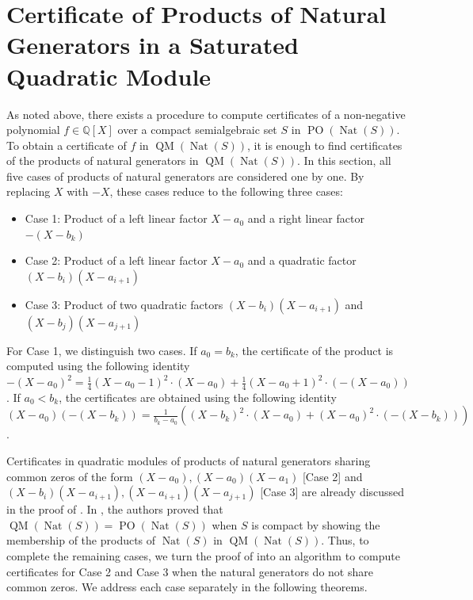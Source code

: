 \documentclass[preprint,12pt,authoryear]{elsarticle}
\newcommand{\qX}{\mathbb{Q}[X]}
\DeclareMathOperator{\quadmod}{QM}
\DeclareMathOperator{\preord}{PO}
\DeclareMathOperator{\Nat}{Nat}
\begin{document}
 \section{Certificate of Products of Natural Generators in a Saturated Quadratic Module} \label{cert_prods}

As noted above, there exists a procedure to compute certificates of a
non-negative polynomial $f \in \qX$ over a compact semialgebraic set $S$ in
$\preord(\Nat(S))$. To obtain a certificate of $f$ in $\quadmod(\Nat(S))$, it is
enough to find certificates of the products of natural generators in
$\quadmod(\Nat(S))$. In this section, all five cases of products of natural
generators are considered one by one. By replacing $X$ with $-X$, these cases
reduce to the following three cases:

\begin{itemize}
\item Case 1: Product of a left linear factor $X - a_0$ and a right linear
  factor $-(X - b_k)$
\item Case 2: Product of a left linear factor $X - a_0$ and a quadratic factor
  $(X - b_i)(X - a_{i+1})$
\item Case 3: Product of two quadratic factors $(X - b_i)(X - a_{i+1})$ and
  $(X - b_j)(X - a_{j+1})$
\end{itemize}

For Case 1, we distinguish two cases. If $a_0 = b_k$, the certificate of the
product is computed using the following identity
$-(X-a_0)^2 = \frac{1}{4}(X - a_0 -1)^2 \cdot (X - a_0) + \frac{1}{4}(X-a_0+1)^2
\cdot (-(X-a_0))$. If $a_0 < b_k$, the certificates are obtained using the
following identity
$(X-a_0)(-(X-b_k)) = \frac{1}{b_k-a_0}((X-b_k)^2 \cdot (X-a_0) + (X-a_0)^2 \cdot
(-(X-b_k)))$.

Certificates in quadratic modules of products of natural generators sharing
common zeros of the form $(X-a_0), (X-a_0)(X-a_1)$ [Case 2] and
$(X-b_i)(X-a_{i+1}), (X-a_{i+1})(X-a_{j+1})$ [Case 3] are already discussed in
the proof of \cite[Theorem 2.5]{marshall2002}. In \cite[Theorem
3.5]{marshall2005}, the authors proved that
$\quadmod(\Nat(S)) = \preord(\Nat(S))$ when $S$ is compact by showing the
membership of the products of $\Nat(S)$ in $\quadmod(\Nat(S))$. Thus, to complete
the remaining cases, we turn the proof of \cite[Theorem 3.5]{marshall2005} into
an algorithm to compute certificates for Case 2 and Case 3 when the natural
generators do not share common zeros. We address each case separately in the
following theorems.
\end{document}
